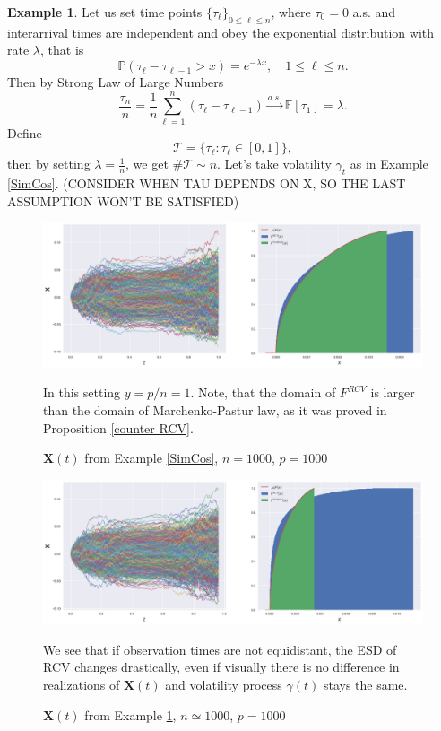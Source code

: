 \documentclass[a4paper,11pt]{article}
\theoremstyle{plain}
\theoremstyle{definition}
\newtheorem{exmp}[thm]{Example}
\newcommand{\ME}{\mathbb{E}}
\newcommand{\MP}{\mathbb{P}}
\begin{document}
    \begin{exmp} \label{PosTimes}
    	Let us set time points $ \{\tau_\ell\}_{0 \leq \ell \leq n}$, where $\tau_0 = 0$ a.s. and interarrival times are independent and obey the exponential distribution with rate $\lambda$, that is 
    	\[ \MP(\tau_{\ell} - \tau_{\ell-1} > x) =  e^{-\lambda x}, \quad 1 \leq \ell \leq n. \]
    	Then by Strong Law of Large Numbers
    	\[ \frac{\tau_n}{n} = \frac{1}{n} \sum_{\ell=1}^{n} (\tau_{\ell} - \tau_{\ell-1}) \xrightarrow{a.s.} \ME[\tau_1] = \lambda. \]
    	Define
    	\[ \mathcal{T} = \{\tau_\ell : \tau_\ell \in [0, 1]\}, \]
    	then by setting $\lambda = \frac{1}{n}$, we get $\#\mathcal{T} \sim n$.
    	Let's take volatility $\gamma_t$ as in Example \ref{SimCos}.
    	(CONSIDER WHEN TAU DEPENDS ON X, SO THE LAST ASSUMPTION WON'T BE SATISFIED)
    \end{exmp}
    
    \begin{figure}
    	\begin{center} \centering
    		\includegraphics[scale=0.4]{XCos}
    		\caption{ $\mathbf{X}(t)$ from Example \ref{SimCos}, $n = 1000$, $p=1000$ }
    		\smallskip
    		\small
    		In this setting $y = p/n = 1$. Note, that the domain of $F^{RCV}$ is larger than the domain of Marchenko-Pastur law, as it was proved in Proposition \ref{counter RCV}.
    	\end{center}
    \end{figure}
    
    \begin{figure}
    	\begin{center} \centering
    		\includegraphics[scale=0.4]{Xcostimes}
    		\caption{ $\mathbf{X}(t)$ from Example \ref{PosTimes}, $n \simeq 1000$, $p=1000$ }
    		\smallskip
    		\small
    		We see that if observation times are not equidistant, the ESD of RCV changes drastically, even if visually there is no difference in realizations of $\mathbf{X}(t)$ and volatility process $\gamma(t)$ stays the same.
    	\end{center}
    \end{figure}
    
\end{document}
